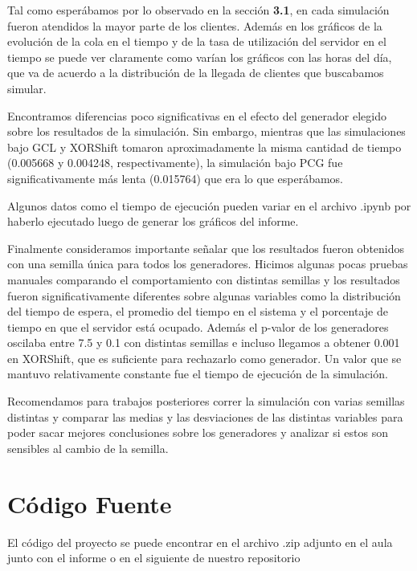 \documentclass[a4paper, 12pt]{article}
\begin{document}
Tal como esperábamos por lo observado en la sección \textbf{3.1}, en cada simulación fueron atendidos la mayor parte de los clientes. Además en los gráficos de la evolución de la cola en el tiempo y de la tasa de utilización del servidor en el tiempo se puede ver claramente como varían los gráficos con las horas del día, que va de acuerdo a la distribución de la llegada de clientes que buscabamos simular.

Encontramos diferencias poco significativas en el efecto del generador elegido sobre los resultados de la simulación.
Sin embargo, mientras que las simulaciones bajo GCL y XORShift
tomaron aproximadamente la misma cantidad de tiempo (0.005668 y 0.004248,
respectivamente), la simulación bajo PCG fue significativamente más lenta 
(0.015764) que era lo que esperábamos.

Algunos datos como el tiempo de ejecución pueden variar en el archivo .ipynb por haberlo ejecutado luego de generar los gráficos del informe.

Finalmente consideramos importante señalar que los resultados fueron obtenidos con una semilla única para todos los generadores. Hicimos algunas pocas pruebas manuales comparando el comportamiento con distintas semillas y los resultados fueron significativamente diferentes sobre algunas variables como la distribución del tiempo de espera, el promedio del tiempo en el sistema y el porcentaje de tiempo en que el servidor está ocupado. Además el p-valor de los generadores oscilaba entre 7.5 y 0.1 con distintas semillas e incluso llegamos a obtener 0.001 en XORShift, que es suficiente para rechazarlo como generador. Un valor que se mantuvo relativamente constante fue el tiempo de ejecución de la simulación.

Recomendamos para trabajos posteriores correr la simulación con varias semillas distintas y comparar las medias y las desviaciones de las distintas variables para poder sacar mejores conclusiones sobre los generadores y analizar si estos son sensibles al cambio de la semilla.

\section{Código Fuente}

El código del proyecto se puede encontrar en el archivo .zip adjunto en el aula junto con el informe o en el siguiente 
\href{https://github.com/slopezpereyra/ModelosTE}{\color{blue}{link}}
de nuestro repositorio
\end{document}
